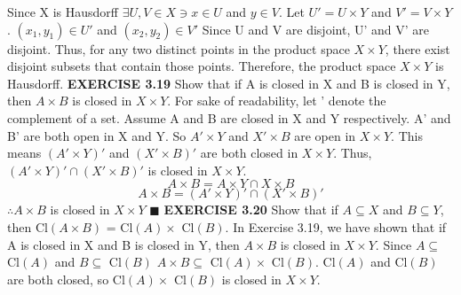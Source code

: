 \documentclass[12pt]{article}
\begin{document}
  Since X is Hausdorff \(\exists U, V \in X \ni x \in U\) and \(y \in V\).
  \newline
  Let \(U' = U \times Y\) and \(V' = V \times Y\).
  \newline
  \((x_1, y_1) \in U'\) and \((x_2,y_2) \in V'\)
  \newline
  Since U and V are disjoint, U' and V' are disjoint.
  \newline
  Thus, for any two distinct points in the product space \(X \times Y\), there exist disjoint subsets that contain those points.
  \newline \newline
  Therefore, the product space \(X \times Y\) is Hausdorff.
  \newpage
  \noindent
  \textbf{EXERCISE 3.19}
  Show that if A is closed in X and B is closed in Y, then \(A \times B\) is closed in \(X \times Y\).
  \newline \newline
  For sake of readability, let ' denote the complement of a set.
  \newline \newline
  Assume A and B are closed in X and Y respectively. \newline
  A' and B' are both open in X and Y.
  \newline
  So \(A' \times Y\) and \(X' \times B\) are open in \(X \times Y\).
  \newline
  This means \((A' \times Y)'\) and \((X' \times B)'\) are both closed in \(X \times Y\).
  \newline
  Thus, \((A' \times Y)' \cap (X' \times B)'\) is closed in \(X \times Y\).
  \[A \times B = A \times Y \cap X \times B\]
  \[A \times B = (A' \times Y)' \cap (X' \times B)'\]
  \(\therefore A \times B\) is closed in \(X \times Y\)
  \newline \(\blacksquare\)
  \newpage
  \noindent
  \textbf{EXERCISE 3.20}
  Show that if \(A \subseteq X\) and \(B \subseteq Y\), then Cl\((A \times B)\) = Cl\((A) \times\) Cl\((B)\).
  \newline \newline
  In Exercise 3.19, we have shown that if A is closed in X and B is closed in Y, then \(A \times B\) is closed in \(X \times Y\). \newline \newline
  Since \(A \subseteq\) Cl\((A)\) and \(B \subseteq\) Cl\((B)\)
  \(A \times B \subseteq\) Cl\((A) \times\) Cl\((B)\).
  \newline
  Cl\((A)\) and Cl\((B)\) are both closed, so Cl\((A) \times\) Cl\((B)\) is closed in \(X \times Y\).
\end{document}
